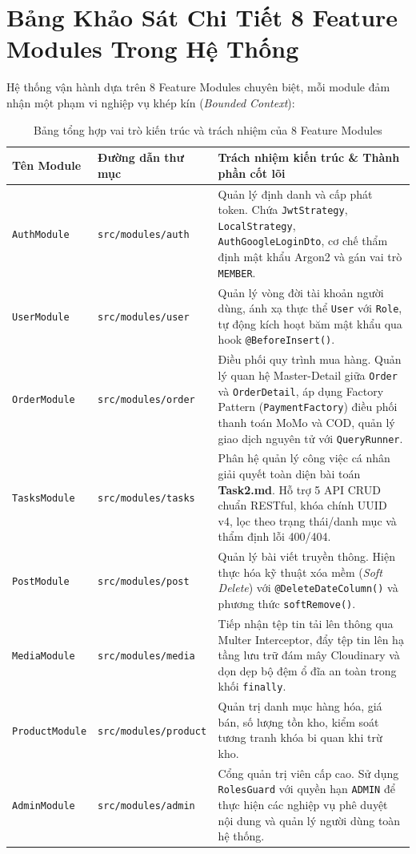 \documentclass[12pt,a4paper,oneside]{book}
\begin{document}
\section{Bảng Khảo Sát Chi Tiết 8 Feature Modules Trong Hệ Thống}
Hệ thống vận hành dựa trên 8 Feature Modules chuyên biệt, mỗi module đảm nhận một phạm vi nghiệp vụ khép kín (\textit{Bounded Context}):

\begin{table}[htbp]
  \centering
  \small
  \caption{Bảng tổng hợp vai trò kiến trúc và trách nhiệm của 8 Feature Modules}
  \label{tab:system-modules}
  \begin{tabularx}{\textwidth}{p{2.6cm} p{3.8cm} X}
    \toprule
    \textbf{Tên Module} & \textbf{Đường dẫn thư mục} & \textbf{Trách nhiệm kiến trúc \& Thành phần cốt lõi} \\
    \midrule
    \texttt{AuthModule} & \texttt{src/modules/auth} & Quản lý định danh và cấp phát token. Chứa \texttt{JwtStrategy}, \texttt{LocalStrategy}, \texttt{AuthGoogleLoginDto}, cơ chế thẩm định mật khẩu Argon2 và gán vai trò \texttt{MEMBER}. \\
    \texttt{UserModule} & \texttt{src/modules/user} & Quản lý vòng đời tài khoản người dùng, ánh xạ thực thể \texttt{User} với \texttt{Role}, tự động kích hoạt băm mật khẩu qua hook \texttt{@BeforeInsert()}. \\
    \texttt{OrderModule} & \texttt{src/modules/order} & Điều phối quy trình mua hàng. Quản lý quan hệ Master-Detail giữa \texttt{Order} và \texttt{OrderDetail}, áp dụng Factory Pattern (\texttt{PaymentFactory}) điều phối thanh toán MoMo và COD, quản lý giao dịch nguyên tử với \texttt{QueryRunner}. \\
    \texttt{TasksModule} & \texttt{src/modules/tasks} & Phân hệ quản lý công việc cá nhân giải quyết toàn diện bài toán \textbf{Task2.md}. Hỗ trợ 5 API CRUD chuẩn RESTful, khóa chính UUID v4, lọc theo trạng thái/danh mục và thẩm định lỗi 400/404. \\
    \texttt{PostModule} & \texttt{src/modules/post} & Quản lý bài viết truyền thông. Hiện thực hóa kỹ thuật xóa mềm (\textit{Soft Delete}) với \texttt{@DeleteDateColumn()} và phương thức \texttt{softRemove()}. \\
    \texttt{MediaModule} & \texttt{src/modules/media} & Tiếp nhận tệp tin tải lên thông qua Multer Interceptor, đẩy tệp tin lên hạ tầng lưu trữ đám mây Cloudinary và dọn dẹp bộ đệm ổ đĩa an toàn trong khối \texttt{finally}. \\
    \texttt{ProductModule} & \texttt{src/modules/product} & Quản trị danh mục hàng hóa, giá bán, số lượng tồn kho, kiểm soát tương tranh khóa bi quan khi trừ kho. \\
    \texttt{AdminModule} & \texttt{src/modules/admin} & Cổng quản trị viên cấp cao. Sử dụng \texttt{RolesGuard} với quyền hạn \texttt{ADMIN} để thực hiện các nghiệp vụ phê duyệt nội dung và quản lý người dùng toàn hệ thống. \\
    \bottomrule
  \end{tabularx}
\end{table}
\end{document}
